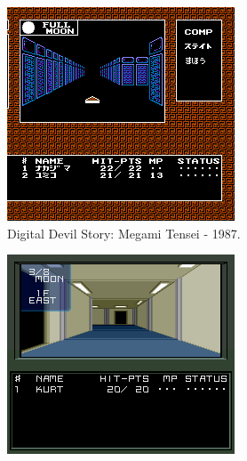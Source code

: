 \begin{figure}[h!]
  \centering
  \begin{subfigure}[b]{0.4\linewidth}
    \includegraphics[width=\linewidth]{mt.jpg}
     \caption{Digital Devil Story: Megami Tensei - 1987.}
  \end{subfigure}
  \begin{subfigure}[b]{0.4\linewidth}
    \includegraphics[width=\linewidth]{smt1.jpg}

\end{subfigure}
\end{figure}
